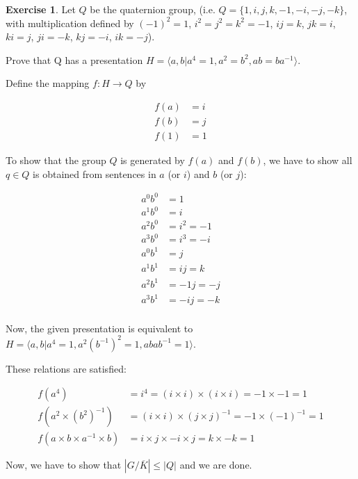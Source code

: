 \documentclass[11pt,oneside]{article}
\numberwithin{equation}{section}
\theoremstyle{definition}
\newtheorem{exercise}{Exercise}
\begin{document}
\begin{exercise}
  Let $Q$ be the quaternion group, (i.e. $Q = \{1, i, j, k, -1 , -i,
  -j, -k\}$, with multiplication defined by $(-1)^2 = 1$,
  $i^2 = j^2 = k^2 = -1$, $ij = k$, $jk =i$, $ki =j$,
  $ji = -k$, $kj =-i$, $ik =-j$).  

  Prove that Q has a presentation $H = \langle a,b |  a^4 =1 , a^2 = b^2, ab= ba^{-1}\rangle$.
  
\end{exercise}
\begin{solution}

  Define the mapping $f : H \to Q$ by

  \begin{align*}
    f(a) &= i \\
    f(b) &= j \\
    f(1) &= 1
  \end{align*}

  To show that the group $Q$ is generated by $f(a)$ and $f(b)$, we have to show all $q \in Q$ is obtained from sentences in $a$ (or $i$) and
  $b$ (or $j$):

  \begin{align*}
      a^0 b^0 & = 1\\
    a^1 b^0 & =  i\\
    a^2 b^0 & = i ^ 2 = -1\\
    a^3 b^0 & = i^3 = -i \\
    a^0 b^1 & = j\\
    a^1 b^1 & = i j = k \\
    a^2 b^1 & = -1 j =  -j\\
    a^3 b^1 & = -i j = -k\\
  \end{align*}
  
  Now, the given presentation is equivalent to $H = \langle a,b |  a^4 =1 , a^2 (b^ {-1}) ^2 = 1,  abab^{-1} = 1 \rangle$.

  These relations are satisfied:

  \begin{align*}
    f(a^4) & = i ^ 4 = (i \times i) \times (i \times i) = -1 \times -1 = 1 \\
    f(a^2 \times (b ^ 2) ^ {-1}) & = (i \times i ) \times (j \times j) ^ {-1} = -1 \times (-1 ) ^ {-1} = 1 \\
    f(a \times b \times a ^ {-1} \times b) &= i \times j \times -i \times j = k \times -k = 1 
  \end{align*}

  Now, we have to show that $ |G/{\overline K}| \leq |Q|$ and we are done.


\end{solution}
\end{document}
